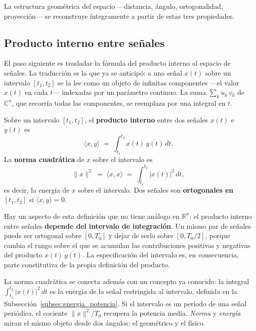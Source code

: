 \documentclass[class=book, crop=false]{standalone}
\begin{document}
La estructura geométrica del espacio —distancia, ángulo, ortogonalidad,
proyección— se reconstruye íntegramente a partir de estas tres
propiedades.

\subsection{Producto interno entre señales}
\label{subsec:producto_interno_senales}

El paso siguiente es trasladar la fórmula del producto interno al espacio
de señales. La traducción es la que ya se anticipó: a una señal $x(t)$
sobre un intervalo $[t_1,t_2]$ se la lee como un objeto de infinitas
componentes —el valor $x(t)$ en cada $t$— indexadas por un parámetro
continuo. La suma $\sum_k u_k\,\overline{v_k}$ de $\mathbb{C}^n$, que
recorría todas las componentes, se reemplaza por una integral en $t$.

\begin{resultado}
Sobre un intervalo $[t_1,t_2]$, el \textbf{producto interno} entre dos
señales $x(t)$ e $y(t)$ es
\begin{equation}
    \langle x, y\rangle \;=\; \int_{t_1}^{t_2} x(t)\,\overline{y(t)}\,dt.
    \label{eq:pi_senales}
\end{equation}
La \textbf{norma cuadrática} de $x$ sobre el intervalo es
\begin{equation}
    \|x\|^2 \;=\; \langle x, x\rangle \;=\; \int_{t_1}^{t_2} |x(t)|^2\,dt,
    \label{eq:norma_senal}
\end{equation}
es decir, la energía de $x$ sobre el intervalo. Dos señales son
\textbf{ortogonales en $[t_1,t_2]$} si $\langle x,y\rangle = 0$.
\end{resultado}

Hay un aspecto de esta definición que no tiene análogo en $\mathbb{R}^n$:
el producto interno entre señales \textbf{depende del intervalo de
integración}. Un mismo par de señales puede ser ortogonal sobre $[0, T_0]$
y dejar de serlo sobre $[0, T_0/2]$, porque cambia el rango sobre el que
se acumulan las contribuciones positivas y negativas del producto
$x(t)\,\overline{y(t)}$. La especificación del intervalo es, en
consecuencia, parte constitutiva de la propia definición del producto.

La norma cuadrática se conecta además con un concepto ya conocido:
la integral $\int_{t_1}^{t_2} |x(t)|^2\,dt$ es la energía de la señal
restringida al intervalo, definida en la
Subsección~\ref{subsec:energia_potencia}. Si el intervalo es un período
de una señal periódica, el cociente $\|x\|^2 / T_0$ recupera la
potencia media. \emph{Norma} y \emph{energía} miran el mismo objeto
desde dos ángulos: el geométrico y el físico.
\end{document}
